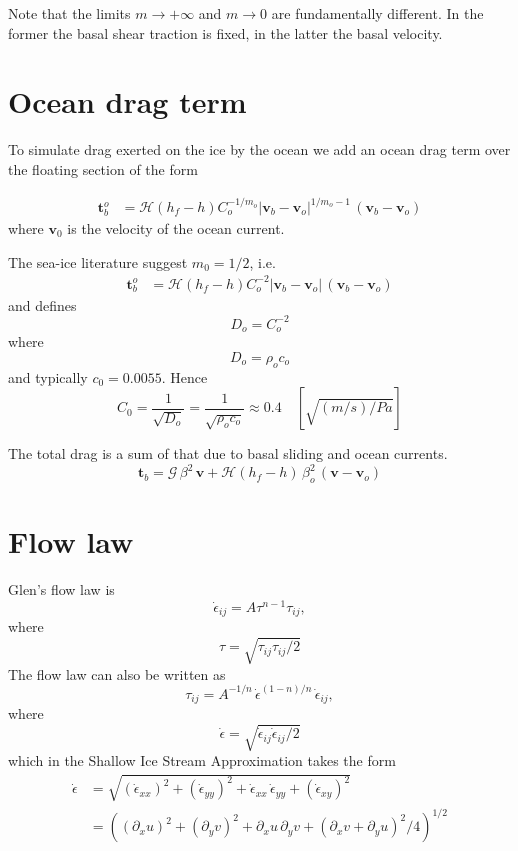 \documentclass[10pt,a4paper]{book}
\newcommand{\He}{\mathcal{H}}
\newcommand{\G}{\mathcal{G}}
\newcommand{\p}{\partial}
\newcommand{\eps}{\dot{\epsilon}}
\newcommand{\eij}{\dot{\epsilon}_{ij}}
\newcommand{\exx}{\dot{\epsilon}_{xx}}
\newcommand{\eyy}{\dot{\epsilon}_{yy}}
\newcommand{\exy}{\dot{\epsilon}_{xy}}
\newcommand{\tij}{\tau_{ij}}
\begin{document}
Note that the limits $m\to+\infty$ and $m \to 0$ are fundamentally
different. In the former the basal shear traction is fixed, in the
latter the basal velocity.



\section{Ocean drag term}



To simulate drag exerted on the ice by the ocean we add an ocean drag
term over the floating section of the form

\begin{align*} 
\bm{t}_b^o & = \He(h_f-h) C_o^{-1/m_o} | \bm{v}_b - \bm{v}_o|^{1/m_o-1}  \, (\bm{v}_b-\bm{v}_o) 
\end{align*}
where $\bm{v}_0$ is the velocity of the ocean current. 

The sea-ice literature suggest $ m_0=1/2$, i.e. 
\begin{align*} 
\bm{t}_b^o & = \He(h_f-h) C_o^{-2} | \bm{v}_b - \bm{v}_o|  \, (\bm{v}_b-\bm{v}_o) 
\end{align*}
and defines
\[
 D_o=C_o^{-2}
\] 
where
\[
D_o=\rho_o c_o
\]
and typically $c_0=0.0055$. Hence
\[
C_0=\frac{1}{\sqrt{D_o}} = \frac{1}{\sqrt{\rho_o c_o}} \approx 0.4  \quad [\sqrt{(m/s)/Pa}]
\]



The total drag is a sum of that due to basal sliding and ocean currents. 
\[
\bm{t}_b=\G \, \beta^2 \, \bm{v} + \He(h_f-h) \, \beta^2_o \, (\bm{v}-\bm{v}_o)
\] 

\section{Flow law}

Glen's flow law is 
\[
\eij=A \tau^{n-1} \tau_{ij},
\]
where  
\[
\tau=\sqrt{\tij \tij /2}
\]
The flow law can also be written as
\begin{equation}
\tau_{ij}=A^{-1/n} \,\dot{\epsilon}^{(1-n)/n}\, \dot{\epsilon}_{ij},
\label{eq:GlenTau}
\end{equation}
where
\[ 
\dot{\epsilon}=\sqrt{ \eij \eij /2}
\]                              %
which in the Shallow Ice Stream Approximation takes the form
\begin{align}
\eps& =\sqrt{ (\exx)^2 + (\eyy)^2 + \exx \,\eyy + (\exy)^2} \\
    & = ((\p_{x} u)^2 + (\p_{y} v)^2 + \p_{x} u \,\p_{y} v + (\p_{x} v + \p_{y} u)^2/4)^{1/2}
\end{align}
\end{document}
